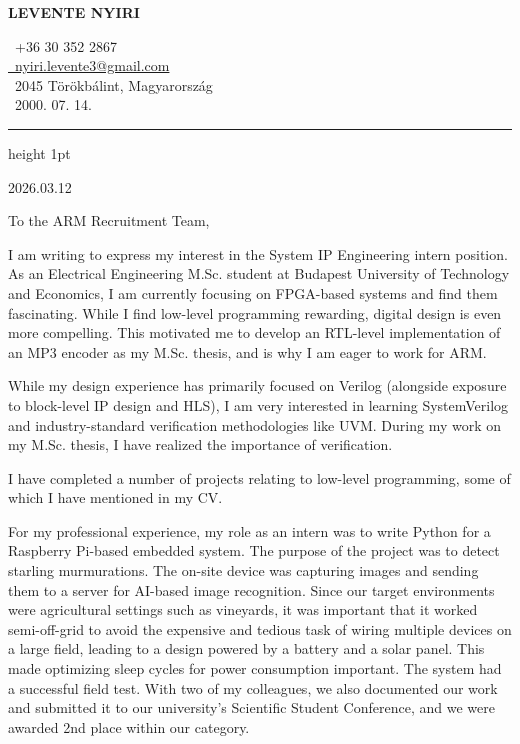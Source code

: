 \documentclass{article}
\begin{document}
\begin{center}
  \begin{minipage}{0.45\textwidth}
    {\Huge\bfseries LEVENTE NYIRI}
  \end{minipage}\hfill
  \begin{minipage}{0.45\textwidth}
    \raggedleft
    \faPhone\ +36 30 352 2867 \\
    \href{mailto:nyiri.levente3@gmail.com}{\faEnvelope\ nyiri.levente3@gmail.com} \\
    \faMapMarker\ 2045 Törökbálint, Magyarország \\
    \faCalendar\ 2000. 07. 14.
  \end{minipage}
\end{center}

\vspace{1em}
\hrule height 1pt
\vspace{1.5em}

2026.03.12

To the ARM Recruitment Team,

I am writing to express my interest in the System IP Engineering intern position. 
As an Electrical Engineering M.Sc. student at Budapest University of Technology and Economics, I am currently focusing on FPGA-based systems and find them fascinating. While I find low-level programming rewarding, digital design is even more compelling. This motivated me to develop an RTL-level implementation of an MP3 encoder as my M.Sc. thesis, and is why I am eager to work for ARM.



While my design experience has primarily focused on Verilog (alongside exposure to block-level IP design and HLS), I am very interested in learning SystemVerilog and industry-standard verification methodologies like UVM.
During my work on my M.Sc. thesis, I have realized the importance of verification.

I have completed a number of projects relating to low-level programming, some of which I have mentioned in my CV.

For my professional experience, my role as an intern was to write Python for a Raspberry Pi-based embedded system. The purpose of the project was to detect starling murmurations. The on-site device was capturing images and sending them to a server for AI-based image recognition. Since our target environments were agricultural settings such as vineyards, it was important that it worked semi-off-grid to avoid the expensive and tedious task of wiring multiple devices on a large field, leading to a design powered by a battery and a solar panel.
This made optimizing sleep cycles for power consumption important.
The system had a successful field test. With two of my colleagues, we also documented our work and submitted it to our university's Scientific Student Conference, and we were awarded 2nd place within our category.
\end{document}
